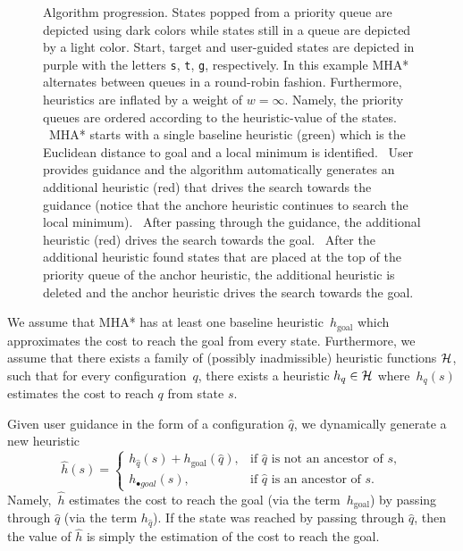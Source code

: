 \documentclass{article}
\begin{document}
\begin{figure}[t]
{    Algorithm progression.
    States popped from a priority queue are depicted using dark colors while states still in a queue are depicted by a light color.
    Start, target and user-guided states are depicted in purple with the letters \texttt{s}, \texttt{t}, \texttt{g}, respectively. 
    In this example MHA* alternates between queues in a round-robin fashion. Furthermore, heuristics are inflated by a weight of $w=\infty$. Namely, the priority queues are ordered according to the heuristic-value of the states.
	~MHA* starts with a single baseline heuristic (green) which is the Euclidean distance to goal and a local minimum is identified.
	~User provides guidance and the algorithm automatically generates an additional heuristic (red) that drives the search towards the guidance (notice that the anchore heuristic continues to search the local minimum).
	~After passing through the guidance, the additional heuristic (red) drives the search towards the goal.
	~After the additional heuristic found states that are placed at the top of the priority queue of the anchor heuristic, the additional heuristic is deleted and the anchor heuristic drives the search towards the goal.
  }%
  \label{fig:filmstrip-dynamic_heuristic}%
  \vspace{-2.5mm}
\end{figure}



We assume that MHA* has at least one baseline heuristic~$h_{\text{goal}}$ which approximates the cost to reach the goal from every state.
Furthermore, we assume that there exists a family of (possibly inadmissible) heuristic functions $\mathcal{H}$, such that for every configuration~$q$, there exists a heuristic $h_q \in \mathcal{H}$ where~$h_q(s)$ estimates the cost to reach $q$ from state $s$.

Given user guidance in the form of a configuration $\hat{q}$, we dynamically generate a new heuristic $$
    \hat{h}(s)= 
\begin{cases}
    h_{\hat{q}}(s) + h_{\text{goal}}(\hat{q}),	& 
    		\text{if } \hat{q} \text{ is not an ancestor of } s,\\
    h_{\textbf{•}{goal}}(s),            		& 
    		\text{if } \hat{q} \text{ is an ancestor of } s.
\end{cases}
$$
Namely,~$\hat{h}$ estimates the 
cost to reach the goal (via the term~$h_{\text{goal}}$) by passing through $\hat{q}$ (via the term $h_{\hat{q}}$). If the state was reached by passing through $\hat{q}$, then the value of $\hat{h}$ is simply the estimation of the cost to reach the goal.
\end{document}
